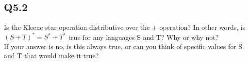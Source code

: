 \documentclass{article}
\begin{document}
\subsection*{Q5.2}
Is the Kleene star operation distributive over the + operation? In other words, is $(S+T)^*=S^*+T^*$ true for any languages S and T? Why or why not?
\\ If your answer is no, is this always true, or can you think of specific values for S and T that would make it true?
\newpage
\end{document}
